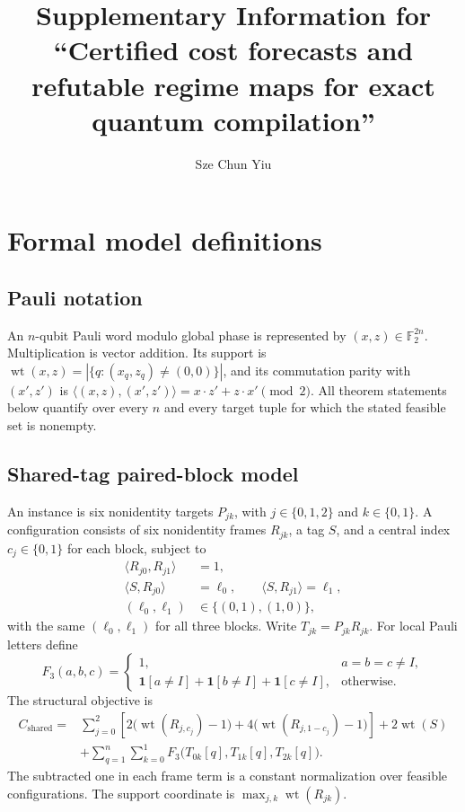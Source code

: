 \documentclass[a4paper,onecolumn,11pt,unpublished,noarxiv]{quantumarticle}
\begin{document}
\title{Supplementary Information for ``Certified cost forecasts and refutable regime maps for exact quantum compilation''}
\author{Sze Chun Yiu}
\maketitle


\section{Formal model definitions}\label{sec:formal-models}

\subsection{Pauli notation}

An $n$-qubit Pauli word modulo global phase is represented by $(x,z)\in\mathbb F_2^{2n}$.  Multiplication is vector addition.  Its support is $\operatorname{wt}(x,z)=|\{q:(x_q,z_q)\ne(0,0)\}|$, and its commutation parity with $(x',z')$ is $\langle(x,z),(x',z')\rangle=x\mathbin{\cdot}z'+z\mathbin{\cdot}x'\pmod2$.  All theorem statements below quantify over every $n$ and every target tuple for which the stated feasible set is nonempty.

\subsection{Shared-tag paired-block model}

An instance is six nonidentity targets $P_{jk}$, with $j\in\{0,1,2\}$ and $k\in\{0,1\}$.  A configuration consists of six nonidentity frames $R_{jk}$, a tag $S$, and a central index $c_j\in\{0,1\}$ for each block, subject to
\begin{align}
\langle R_{j0},R_{j1}\rangle&=1,\\
\langle S,R_{j0}\rangle&=\ell_0,\qquad
\langle S,R_{j1}\rangle=\ell_1,\\
(\ell_0,\ell_1)&\in\{(0,1),(1,0)\},
\end{align}
with the same $(\ell_0,\ell_1)$ for all three blocks.  Write $T_{jk}=P_{jk}R_{jk}$.  For local Pauli letters define
\begin{equation}
F_3(a,b,c)=
\begin{cases}
1,&a=b=c\ne I,\\
\mathbf1[a\ne I]+\mathbf1[b\ne I]+\mathbf1[c\ne I],&\text{otherwise}.
\end{cases}
\end{equation}
The structural objective is
\begin{align}
C_{\mathrm{shared}}={}&\sum_{j=0}^2\left[2\bigl(\operatorname{wt}(R_{j,c_j})-1\bigr)+4\bigl(\operatorname{wt}(R_{j,1-c_j})-1\bigr)\right]+2\operatorname{wt}(S)\nonumber\\
&+\sum_{q=1}^n\sum_{k=0}^1F_3\bigl(T_{0k}[q],T_{1k}[q],T_{2k}[q]\bigr).
\label{eq:shared-cost}
\end{align}
The subtracted one in each frame term is a constant normalization over feasible configurations.  The support coordinate is $\max_{j,k}\operatorname{wt}(R_{jk})$.
\end{document}
